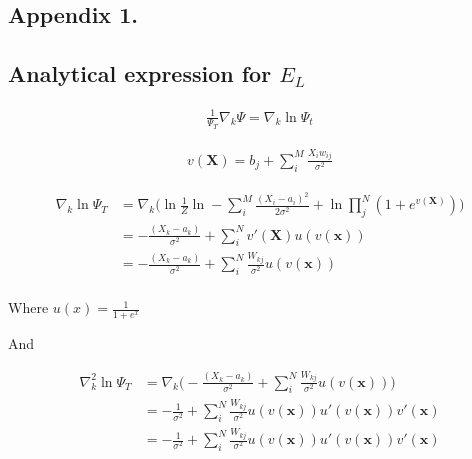 \documentclass[%
oneside,                 %
final,                   %
10pt]{article}
\begin{document}
 \label{refer}



\begin{appendices}
\section{Appendix 1.} \label{APP_1}

\subsection{Analytical expression for $E_L$}
\begin{align*}
\frac{1}{\Psi_T} \nabla_k \Psi = \nabla_k \ln \Psi_t
\end{align*}

\begin{align*}
v(\bm X)=b_j + \sum_i^M \frac{X_i w_{ij}}{\sigma^2}
\end{align*}


\begin{align*}
\nabla_k  \ln \Psi_T &= \nabla_k  \big( \ln \frac{1}{Z} \ln -\sum_i^M \frac{(X_i - a_i)^2}{2\sigma^2} + \ln \prod_j^N (1 + e^{ v(\bm X)}) \big) \\
&= 
  - \frac{(X_k - a_k)}{\sigma^2} + \sum_{i}^N v'(\bm X) u( v(\bm x))  \\
&=
  - \frac{(X_k - a_k)}{\sigma^2} + \sum_{i}^N \frac{W_{kj}}{\sigma^2} u( v(\bm x))  \\
\end{align*}

Where $u(x)=\frac{1}{1+e^x}$

And 


\begin{align*}
\nabla_k^2  \ln \Psi_T &= \nabla_k  \big( 
  - \frac{(X_k - a_k)}{\sigma^2} + \sum_{i}^N \frac{W_{kj}}{\sigma^2} u( v(\bm x))  \big) \\
  &=
   - \frac{1}{\sigma^2} +  \sum_{i}^N \frac{W_{kj}}{\sigma^2} u( v(\bm x)) u'(v(\bm x)) v'(\bm x) \\
     &=
   - \frac{1}{\sigma^2} +  \sum_{i}^N \frac{W_{kj}}{\sigma^2} u( v(\bm x)) u'(v(\bm x)) v'(\bm x) \\
\end{align*}


\end{appendices}
\end{document}
